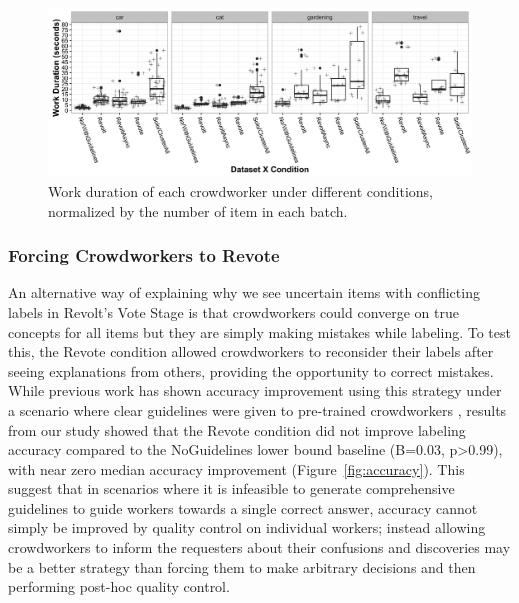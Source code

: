 \begin{figure}[ht]
	\centering
	\includegraphics[width=1\columnwidth]{Chapters/Revolt/figures/runtime.png}
	\caption[
	Work duration of each crowdworker under different conditions. 
	]{
	Work duration of each crowdworker under different conditions, normalized by the number of item in each batch. 
	}
	\label{fig:runtime}
\end{figure}


\subsubsection{Forcing Crowdworkers to Revote} 

An alternative way of explaining why we see uncertain items with conflicting labels in Revolt's Vote Stage is that crowdworkers could converge on true concepts for all items but they are simply making mistakes while labeling. To test this, the Revote condition allowed crowdworkers to reconsider their labels after seeing explanations from others, providing the opportunity to correct mistakes.
While previous work has shown accuracy improvement using this strategy under a scenario where clear guidelines were given to pre-trained crowdworkers \cite{drapeau2016microtalk},  
results from our study showed that the Revote condition did not improve labeling accuracy compared to the NoGuidelines lower bound baseline (B=0.03, p>0.99), with near zero median accuracy improvement (Figure~\ref{fig:accuracy}).  This suggest that in scenarios where it is infeasible to generate comprehensive guidelines to guide workers towards a single correct answer, accuracy cannot simply be improved by quality control on individual workers; instead allowing crowdworkers to inform the requesters about their confusions and discoveries may be a better strategy than forcing them to make arbitrary decisions and then performing post-hoc quality control.

